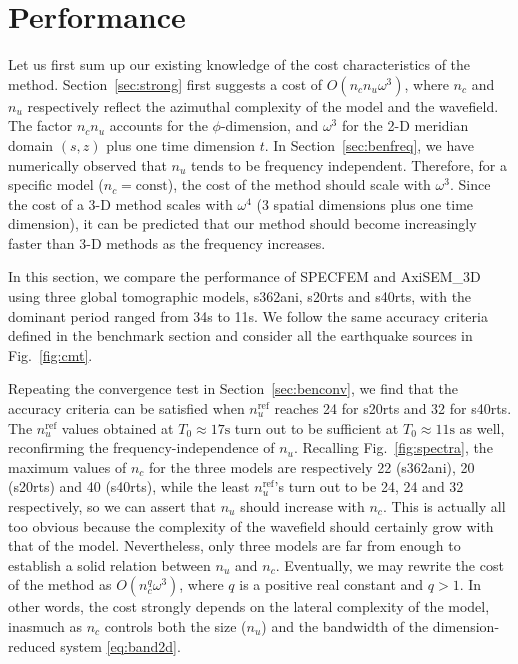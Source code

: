 \documentclass[extra]{gji}
\begin{document}
\section{Performance}
\label{sec:perf}
Let us first sum up our existing knowledge of the cost characteristics of 
the method. Section~\ref{sec:strong} first suggests a cost of 
$O\left(n_c n_u \omega^3\right)$, where $n_c$ and $n_u$ respectively reflect the 
azimuthal complexity of the model and the wavefield.
The factor $n_c n_u$ accounts for the $\phi$-dimension, 
and $\omega^3$ for the 2-D meridian domain $\left(s,z\right)$ 
plus one time dimension $t$. 
In Section~\ref{sec:benfreq}, we have numerically observed that $n_u$ tends to
be frequency independent. 
Therefore, for a specific model ($n_c=\text{const}$), 
the cost of the method should scale with $\omega^3$. 
Since the cost of a 3-D method scales with $\omega^4$
(3 spatial dimensions plus one time dimension), it can be predicted that 
our method should become increasingly faster than 
3-D methods as the frequency increases.

In this section, we compare the performance of SPECFEM and AxiSEM\_3D
using three global tomographic models, s362ani, s20rts and s40rts, 
with the dominant period ranged from 34s to 11s. We follow the same 
accuracy criteria defined in the benchmark section and consider 
all the earthquake sources in Fig.~\ref{fig:cmt}.
 
Repeating the convergence test in Section~\ref{sec:benconv},
we find that the accuracy criteria can be satisfied when 
$n_u^\text{ref}$ reaches 24 for s20rts and 32 for s40rts.
The $n_u^\text{ref}$ values obtained at $T_0\approx17\text{s}$ turn out to be 
sufficient at $T_0\approx11\text{s}$ as well, reconfirming the 
frequency-independence of $n_u$.
Recalling Fig.~\ref{fig:spectra},
the maximum values of $n_c$ for the three models are respectively 
22 (s362ani), 20 (s20rts) and 40 (s40rts), while
the least $n_u^\text{ref}$'s turn out to be 24, 24 and 32 respectively,
so we can assert that $n_u$ should increase with $n_c$. 
This is actually all too obvious
because the complexity of the wavefield should certainly
grow with that of the model.
Nevertheless, only three models are far from enough to establish 
a solid relation between $n_u$ and $n_c$.
Eventually, we may rewrite the cost of the method as 
$O\left(n_c^q \omega^3\right)$, where $q$ is a positive real constant and $q>1$. 
In other words, the cost strongly depends on the lateral complexity 
of the model, inasmuch as $n_c$ controls both the size ($n_u$) and the 
bandwidth of the dimension-reduced system \eqref{eq:band2d}. 
\end{document}
